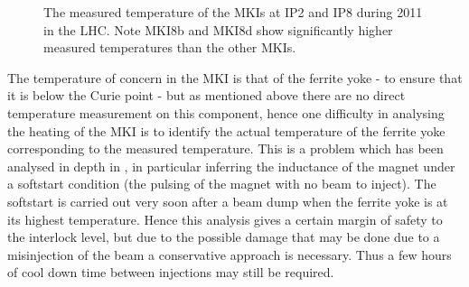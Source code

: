 \begin{figure}
\begin{center}
\end{center}
\caption{The measured temperature of the MKIs at  IP2 and  IP8 during 2011 in the LHC. Note MKI8b and MKI8d show significantly higher measured temperatures than the other MKIs.}
\label{fig:mki-heating-2011}
\end{figure}

The temperature of concern in the MKI is that of the ferrite yoke - to ensure that it is below the Curie point - but as mentioned above there are no direct temperature measurement on this component, hence one difficulty in analysing the heating of the MKI is to identify the actual temperature of the ferrite yoke corresponding to the measured temperature. This is a problem which has been analysed in depth in \cite{Barnes:mkiHeating}, in particular inferring the inductance of the magnet under a softstart condition (the pulsing of the magnet with no beam to inject). The softstart is carried out very soon after a beam dump when the ferrite yoke is at its highest temperature. Hence this analysis gives a certain margin of safety to the interlock level, but due to the possible damage that may be done due to a misinjection of the beam a conservative approach is necessary. Thus a few hours of cool down time between injections may still be required.

